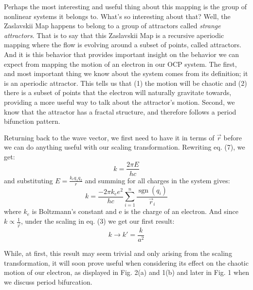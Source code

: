 \documentclass{article}
\newcommand{\sgn}{\mathop{\mathrm{sgn}}}
\begin{document}
Perhaps the most interesting and useful thing about this mapping is the group of nonlinear systems it belongs to. What's so interesting about that? Well, the Zaslavskii Map happens to belong to a group of attractors called \textit{strange attractors}. That is to say that this Zaslavskii Map is a recursive aperiodic mapping where the flow is evolving around a subset of points, called attractors. And it is this behavior that provides important insight on the behavior we can expect from mapping the motion of an electron in our OCP system. The first, and most important thing we know about the system comes from its definition; it is an aperiodic attractor. This tells us that (1) the motion will be chaotic and (2) there is a subset of points that the electron will naturally gravitate towards, providing a more useful way to talk about the attractor's motion. Second, we know that the attractor has a fractal structure\cite{ocp4}, and therefore follows a period bifunction pattern\cite{ocp5}.

Returning back to the wave vector, we first need to have it in terms of $\vec{r}$ before we can do anything useful with our scaling transformation. Rewriting eq. (7), we get:
$$k = \frac{2 \pi E}{hc}$$
and substituting $E = \frac{k_{e}q_{1}q_{2}}{r}$ and summing for all charges in the system gives:
\begin{equation}
k = \frac{-2 \pi k_{e} e^2}{hc} \sum_{i=1}^n \frac{\sgn(q_{i})}{\vec{r}_{i}}
\end{equation}
where $k_{e}$ is Boltzmann's constant and e is the charge of an electron. And since $k \propto \frac{1}{\vec{r}}$, under the scaling in eq. (3) we get our first result:
\begin{equation}
k \to k' = \frac{k}{a^2}
\end{equation}

While, at first, this result may seem trivial and only arising from the scaling transformation, it will soon prove useful when considering its effect on the chaotic motion of our electron, as displayed in Fig. 2(a) and 1(b) and later in Fig. 1 when we discuss period bifurcation.
\end{document}
